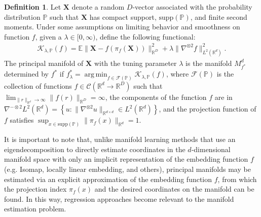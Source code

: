 \documentclass[12pt]{article}
\DeclareMathOperator*{\argmin}{arg\,min}
\theoremstyle{definition}
\newtheorem{definition}{Definition}
\begin{document}
\begin{definition}
  \label{def:principal_manifolds}
  Let $\mathbf{X}$ denote a random $D$-vector associated with the probability distribution $\mathbb{P}$ such that $\mathbf{X}$ has compact support, $\text{supp}(\mathbb{P})$, and finite second moments. Under some assumptions on limiting behavior and smoothness on function $f$, given a $\lambda \in [0, \infty)$, define the following functional:
  \begin{align}\label{eq:pme_kappa}
\mathcal{K}_{\lambda, \mathbb{P}}(f) = \mathbb{E}\|\mathbf{X} - f(\pi_f(\mathbf{X}))\|_{\mathbb{R}^{D}}^2 + \lambda\|\nabla^{\otimes 2}f\|_{L^2(\mathbb{R}^{d})}^2.
  \end{align}
  The principal manifold of $\mathbf{X}$ with the tuning parameter $\lambda$ is the manifold $M_{f^{*}}^{d}$ determined by $f^{*}$ if
  $f_{\lambda}^{*} = \argmin_{f \in \mathcal{F}(\mathbb{P})}\mathcal{K}_{\lambda, \mathbb{P}}(f)$,
where $\mathcal{F}(\mathbb{P})$ is the collection of functions $f \in \mathcal{C}(\mathbb{R}^{d} \to \mathbb{R}^{D})$ such that $\lim_{\|r\|_{\mathbb{R}^{d}} \to \infty}\|f(r)\|_{\mathbb{R}^{D}} = \infty$, the components of the function $f$ are in $\nabla^{-\otimes 2}L^2(\mathbb{R}^{d}) = \left\{u : \|\nabla^{\otimes 2} u\|_{\mathbb{R}^{d \times d}} \in L^2(\mathbb{R}^{d})\right\}$, and the projection function of $f$ satisfies $\sup_{x \in \text{supp}(\mathbb{P})}\|\pi_f(x)\|_{\mathbb{R}^{d}} = 1$.
\end{definition}

It is important to note that, unlike manifold learning methods that use an eigendecomposition to directly estimate coordinates in the $d$-dimensional manifold space with only an implicit representation of the embedding function $f$ (e.g. Isomap, locally linear embedding, and others), principal manifolds may be estimated via an explicit approximation of the embedding function $f$, from which the projection index $\pi_f(x)$ and the desired coordinates on the manifold can be found. In this way, regression approaches become relevant to the manifold estimation problem.
\end{document}
